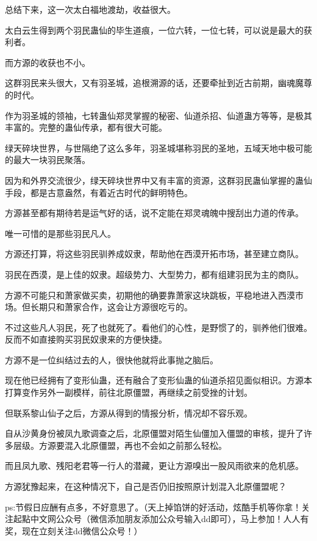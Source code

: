 \begin{this_body}
总结下来，这一次太白福地渡劫，收益很大。

太白云生得到两个羽民蛊仙的毕生道痕，一位六转，一位七转，可以说是最大的获利者。

而方源的收获也不小。

这群羽民来头很大，又有羽圣城，追根溯源的话，还要牵扯到近古前期，幽魂魔尊的时代。

作为羽圣城的领袖，七转蛊仙郑灵掌握的秘密、仙道杀招、仙道蛊方等等，是极其丰富的。完整的蛊仙传承，都有很大可能。

绿天碎块世界，与世隔绝了这么多年，羽圣城堪称羽民的圣地，五域天地中极可能的最大一块羽民聚落。

因为和外界交流很少，绿天碎块世界中又有丰富的资源，这群羽民蛊仙掌握的蛊仙手段，都是古意盎然，有着近古时代的鲜明特色。

方源甚至都有期待若是运气好的话，说不定能在郑灵魂魄中搜刮出力道的传承。

唯一可惜的是那些羽民凡人。

方源还打算，将这些羽民驯养成奴隶，帮助他在西漠开拓市场，甚至建立商队。

羽民在西漠，是上佳的奴隶。超级势力、大型势力，都有组建羽民为主的商队。

方源不可能只和萧家做买卖，初期他的确要靠萧家这块跳板，平稳地进入西漠市场。但长期只和萧家合作，这会让方源很吃亏的。

不过这些凡人羽民，死了也就死了。看他们的心性，是野惯了的，驯养他们很难。反而不如直接购买羽民奴隶来的方便快捷。

方源不是一位纠结过去的人，很快他就将此事抛之脑后。

现在他已经拥有了变形仙蛊，还有融合了变形仙蛊的仙道杀招见面似相识。方源本打算变作另外一副模样，前往北原僵盟，再继续之前受挫的计划。

但联系黎山仙子之后，方源从得到的情报分析，情况却不容乐观。

自从沙黄身份被凤九歌调查之后，北原僵盟对陌生仙僵加入僵盟的审核，提升了许多层级。方源要混入北原僵盟，再也不会如之前那么轻松。

而且凤九歌、残阳老君等一行人的潜藏，更让方源嗅出一股风雨欲来的危机感。

方源犹豫起来，在这种情况下，自己是否仍旧按照原计划混入北原僵盟呢？

ps:节假日应酬有点多，不好意思了。（天上掉馅饼的好活动，炫酷手机等你拿！关注起點中文网公众号（微信添加朋友添加公众号输入dd即可），马上参加！人人有奖，现在立刻关注dd微信公众号！）

\end{this_body}

